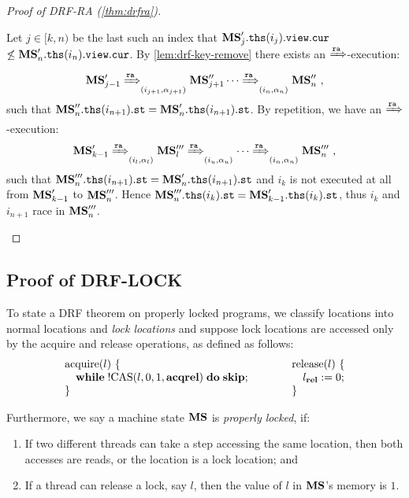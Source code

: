 \begin{proof}[Proof of DRF-RA (\cref{thm:drfra})]
\begin{description}
Let $j \in [k,n)$ be the last such an index that
${\mathbf{MS}}'_{j}.\mathtt{ths}(i_j).\texttt{view}.{\texttt{cur}}$
$\not\leq {\mathbf{MS}}'_{n}.\mathtt{ths}(i_n).\texttt{view}.{\texttt{cur}}$.  By
\cref{lem:drf-key-remove} there exists an $\xRightarrow{\texttt{ra}}$-execution:
\[
{\mathbf{MS}}'_{j-1} \xRightarrow{\texttt{ra}}_{(i_{j+1},\alpha_{j+1})} {\mathbf{MS}}''_{j+1}
\cdots \xRightarrow{\texttt{ra}}_{(i_n,\alpha_n)} {\mathbf{MS}}''_n~,
\]
such that
${\mathbf{MS}}''_n.\mathtt{ths}(i_{n+1}).\texttt{st} = {\mathbf{MS}}'_n.\mathtt{ths}(i_{n+1}).\texttt{st}$.  By
repetition, we have an $\xRightarrow{\texttt{ra}}$-execution:
\[
  {\mathbf{MS}}'_{k-1} \xRightarrow{\texttt{ra}}_{(i_{l},\alpha_{l})} {\mathbf{MS}}'''_{l}
  \xRightarrow{\texttt{ra}}_{(i_{u},\alpha_{u})} \cdots
  \xRightarrow{\texttt{ra}}_{(i_n,\alpha_n)} {\mathbf{MS}}'''_n~,
\]
such that
${\mathbf{MS}}'''_n.\mathtt{ths}(i_{n+1}).\texttt{st} =
{\mathbf{MS}}'_n.\mathtt{ths}(i_{n+1}).\texttt{st}$ and $i_k$ is not executed at all
from ${\mathbf{MS}}'_{k-1}$ to ${\mathbf{MS}}'''_n$.  Hence
${\mathbf{MS}}'''_n.\mathtt{ths}(i_k).\texttt{st} = {\mathbf{MS}}'_{k-1}.\mathtt{ths}(i_k).\texttt{st}$,
thus $i_k$ and $i_{n+1}$ race in ${\mathbf{MS}}'''_n$.  
\end{description}
\end{proof}


\subsection{Proof of DRF-LOCK}
\label{sec:relaxed:proofs:drflock}

To state a DRF theorem on properly locked programs, we classify
locations into normal locations and \emph{lock locations} and suppose
lock locations are accessed only by the acquire and release operations, as
defined as follows:
$$\inparaII{
\textrm{acquire}(l)\ \{ \\
\quad \while{!\cas{l}{0}{1}{\acqr\relw}}{\skipc;} \\
\}
}{
\textrm{release}(l)\ \{ \\
\quad l_{\relw} := 0; \\
\}
}
$$

Furthermore, we say a machine state ${\mathbf{MS}}$
is \emph{properly locked}, if:
\begin{enumerate}
\item If two different threads can take a step
  accessing the same location, then both accesses are reads, or the
  location is a lock location; and
\item If a thread can release a lock, say $l$, then the value
  of $l$ in ${\mathbf{MS}}$'s memory is $1$.
\end{enumerate}

